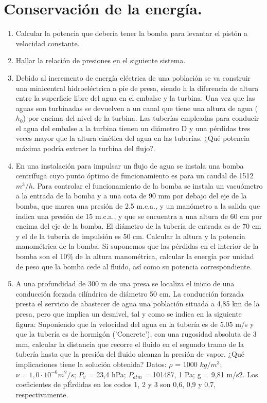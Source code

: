 \section{Conservación de la energía.}
\begin{enumerate}
	\item Calcular la potencia que debería tener la bomba para levantar el pistón a velocidad constante.
	\item Hallar la relación de presiones en el siguiente sistema.
	\item Debido al incremento de energía eléctrica de una población se va construir una minicentral
	hidroeléctrica a pie de presa, siendo h la diferencia de altura entre la superficie libre del
	agua en el embalse y la turbina. Una vez que las aguas son turbinadas se devuelven a un
	canal que tiene una altura de agua ($h_0$) por encima del nivel de la turbina. Las tuberías
	empleadas para conducir el agua del embalse a la turbina tienen un diámetro D y una
	pérdidas tres veces mayor que la altura cinética del agua en las tuberías. ¿Qué potencia
	máxima podría extraer la turbina del flujo?. 
	
	
	\item En una instalación para impulsar un flujo de agua se instala una bomba centrífuga cuyo
	punto óptimo de funcionamiento es para un caudal de 1512 $m^3/h$. Para controlar el
	funcionamiento de la bomba se instala un vacuómetro a la entrada de la bomba y a una
	cota de 90 mm por debajo del eje de la bomba, que marca una presión de 2.5 m.c.a., y un
	manómetro a la salida que indica una presión de 15 m.c.a., y que se encuentra a una altura
	de 60 cm por encima del eje de la bomba. El diámetro de la tubería de entrada es de 70
	cm y el de la tubería de impulsión es 50 cm. Calcular la altura y la potencia manométrica
	de la bomba. Si suponemos que las pérdidas en el interior de la bomba son el 10\% de la
	altura manométrica, calcular la energía por unidad de peso que la bomba cede al fluido,
	así como su potencia correspondiente.
	
	
	
	\item A una profundidad de 300 m de una presa se localiza el inicio de una conducción forzada
	cilíndrica de diámetro 50 cm. La conducción forzada presta el servicio de abastecer de
	agua una población situada a 4,85 km de la presa, pero que implica un desnivel, tal y
	como se indica en la siguiente figura: Suponiendo que la velocidad del agua en la tubería es de 5.05 m/s y que la tubería es de hormigón (’Concrete’), con una rugosidad absoluta
	de 3 mm, calcular la distancia que recorre el fluido en el segundo tramo de la tubería hasta
	que la presión del fluido alcanza la presión de vapor. ¿Qué implicaciones tiene la solución
	obtenida? Datos: $\rho$ = 1000 $kg/m^3$; $\nu = 1,0 \cdot 10^{-6}m^2/s$; $P_v$ = 23,4 hPa;	$P_{atm}$ = 101487, 1 Pa; g = 9,81 m/s2. Los coeficientes de pÉrdidas en los codos 1, 2 y 3 son 0,6, 0,9 y 0,7, respectivamente.
	

\end{enumerate}

